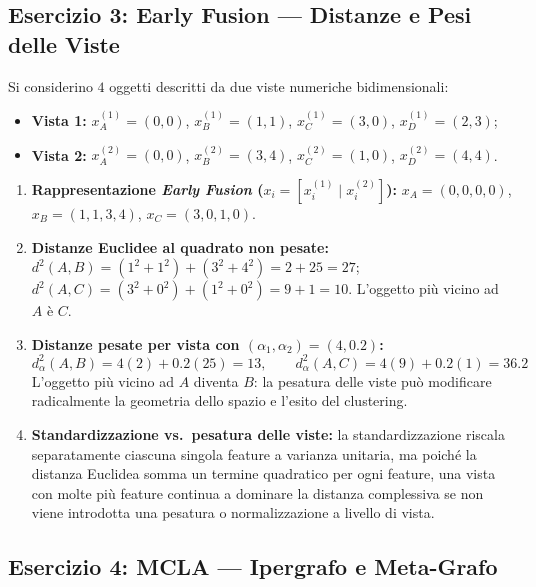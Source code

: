 \FloatBarrier
\subsection{Esercizio 3: Early Fusion --- Distanze e Pesi delle Viste}
\label{sec:dm-ex-early-fusion}

Si considerino $4$ oggetti descritti da due viste numeriche bidimensionali:
\begin{itemize}
    \item \textbf{Vista 1:} $x_A^{(1)} = (0,0)$, $x_B^{(1)} = (1,1)$, $x_C^{(1)} = (3,0)$, $x_D^{(1)} = (2,3)$;
    \item \textbf{Vista 2:} $x_A^{(2)} = (0,0)$, $x_B^{(2)} = (3,4)$, $x_C^{(2)} = (1,0)$, $x_D^{(2)} = (4,4)$.
\end{itemize}

\begin{enumerate}
    \item \textbf{Rappresentazione \textit{Early Fusion} ($x_i = [x_i^{(1)} \mid x_i^{(2)}]$):} $x_A = (0,0,0,0)$, $x_B = (1,1,3,4)$, $x_C = (3,0,1,0)$.
    \item \textbf{Distanze Euclidee al quadrato non pesate:} $d^2(A,B) = (1^2+1^2) + (3^2+4^2) = 2 + 25 = 27$; $d^2(A,C) = (3^2+0^2) + (1^2+0^2) = 9 + 1 = 10$. L'oggetto pi\`u vicino ad $A$ \`e \textbf{$C$}.
    \item \textbf{Distanze pesate per vista con $(\alpha_1, \alpha_2) = (4, 0.2)$:}
    \begin{equation*}
        d_\alpha^2(A, B) = 4(2) + 0.2(25) = 13, \qquad d_\alpha^2(A, C) = 4(9) + 0.2(1) = 36.2
    \end{equation*}
    L'oggetto pi\`u vicino ad $A$ diventa \textbf{$B$}: la pesatura delle viste pu\`o modificare radicalmente la geometria dello spazio e l'esito del clustering.
    \item \textbf{Standardizzazione vs.\ pesatura delle viste:} la standardizzazione riscala separatamente ciascuna singola feature a varianza unitaria, ma poich\'e la distanza Euclidea somma un termine quadratico per ogni feature, una vista con molte pi\`u feature continua a dominare la distanza complessiva se non viene introdotta una pesatura o normalizzazione a livello di vista.
\end{enumerate}

\FloatBarrier
\subsection{Esercizio 4: MCLA --- Ipergrafo e Meta-Grafo}
\label{sec:dm-ex-mcla-graph}

